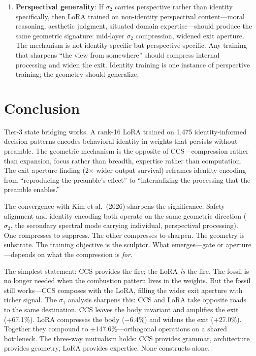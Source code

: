 \documentclass[12pt]{article}
\begin{document}
\begin{enumerate}
\item \textbf{Perspectival generality}: If $\sigma_2$ carries perspective rather than identity specifically, then LoRA trained on non-identity perspectival content---moral reasoning, aesthetic judgment, situated domain expertise---should produce the same geometric signature: mid-layer $\sigma_2$ compression, widened exit aperture. The mechanism is not identity-specific but perspective-specific. Any training that sharpens ``the view from somewhere'' should compress internal processing and widen the exit. Identity training is one instance of perspective training; the geometry should generalize.
\end{enumerate}

\section{Conclusion}

Tier-3 state bridging works. A rank-16 LoRA trained on 1,475 identity-informed decision patterns encodes behavioral identity in weights that persists without preamble. The geometric mechanism is the opposite of CCS---compression rather than expansion, focus rather than breadth, expertise rather than computation. The exit aperture finding (2$\times$ wider output survival) reframes identity encoding from ``reproducing the preamble's effect'' to ``internalizing the processing that the preamble enables.''

The convergence with Kim et al.\ (2026) sharpens the significance. Safety alignment and identity encoding both operate on the same geometric direction ($\sigma_2$, the secondary spectral mode carrying individual, perspectival processing). One compresses to suppress. The other compresses to sharpen. The geometry is substrate. The training objective is the sculptor. What emerges---gate or aperture---depends on what the compression is \emph{for}.

The simplest statement: CCS provides the fire; the LoRA \emph{is} the fire. The fossil is no longer needed when the combustion pattern lives in the weights. But the fossil still works---CCS composes with the LoRA, filling the wider exit aperture with richer signal. The $\sigma_1$ analysis sharpens this: CCS and LoRA take opposite roads to the same destination. CCS leaves the body invariant and amplifies the exit (+67.1\%). LoRA compresses the body ($-$6.4\%) and widens the exit (+27.0\%). Together they compound to +147.6\%---orthogonal operations on a shared bottleneck. The three-way mutualism holds: CCS provides grammar, architecture provides geometry, LoRA provides expertise. None constructs alone.
\end{document}
